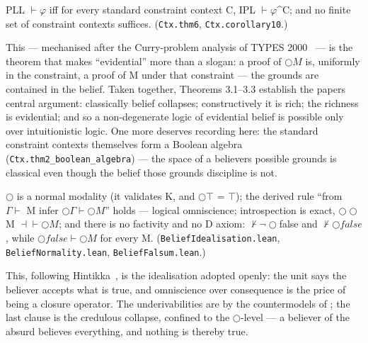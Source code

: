 \begin{theorem}\label{thm:ctx}
PLL \ensuremath{\vdash \varphi} iff for every
standard constraint context C, IPL \ensuremath{\vdash \varphi}\^{}C; and no finite set of
constraint contexts suffices.
(\texttt{Ctx.thm6}, \texttt{Ctx.corollary10}.)
\end{theorem}

This — mechanised after the Curry-problem analysis of TYPES
2000~\cite{FairtloughMendler2002} — is the theorem that makes
``evidential'' more than a slogan: a proof
of \ensuremath{\bigcirc M} is, uniformly in the constraint, a proof of M under that
constraint --- the grounds are contained in the belief. Taken together,
Theorems 3.1--3.3 establish the paper\textquotesingle s central argument: classically
belief collapses; constructively it is rich; the richness is
evidential; and so a non-degenerate logic of evidential belief is
possible only over intuitionistic logic.
One more deserves recording here: the standard constraint contexts
themselves form a Boolean algebra (\texttt{Ctx.thm2\_boolean\_algebra})
--- the space of a believer\textquotesingle s possible grounds is classical even
though the belief those grounds discipline is not.

\begin{proposition}\label{prop:profile}
\ensuremath{\bigcirc} is a normal modality (it validates K, and \ensuremath{\bigcirc\top} = \ensuremath{\top}); the derived
rule ``from \ensuremath{\Gamma \vdash} M infer \ensuremath{\bigcirc\Gamma \vdash \bigcirc M}'' holds --- logical omniscience;
introspection is exact, \ensuremath{\bigcirc\bigcirc}M \ensuremath{\dashv\vdash \bigcirc M}; and there is no factivity and
no D axiom: \ensuremath{\nvdash \lnot\bigcirc}false and \ensuremath{\nvdash \bigcirc\mathit{false}}, while
\ensuremath{\bigcirc\mathit{false} \vdash \bigcirc M} for every M.
(\texttt{BeliefIdealisation.lean}, \texttt{BeliefNormality.lean},
\texttt{BeliefFalsum.lean}.)
\end{proposition}

This, following Hintikka~\cite{Hintikka1962}, is the idealisation
adopted openly: the unit says the believer accepts what
is true, and omniscience over consequence is the price of being a
closure operator. The underivabilities are by the countermodels of
\cite[Fig.~3]{FairtloughMendler1997}; the last clause is the credulous
collapse, confined to the \ensuremath{\bigcirc}-level --- a believer of the absurd
believes everything, and nothing is thereby true.

